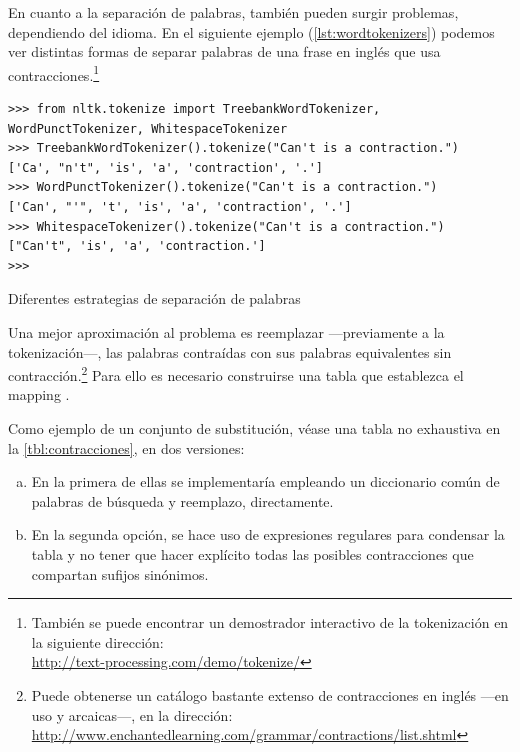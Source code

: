 En cuanto a la separación de palabras, también pueden surgir problemas, dependiendo del idioma. En el siguiente ejemplo (\autoref{lst:wordtokenizers}) podemos ver distintas formas de separar palabras de una frase en inglés que usa contracciones.\footnote{También se puede encontrar un demostrador interactivo de la tokenización en la siguiente dirección:\\
\url{http://text-processing.com/demo/tokenize/}}

\begin{listing}[H]
\begin{verbatim}
>>> from nltk.tokenize import TreebankWordTokenizer, WordPunctTokenizer, WhitespaceTokenizer
>>> TreebankWordTokenizer().tokenize("Can't is a contraction.")
['Ca', "n't", 'is', 'a', 'contraction', '.']
>>> WordPunctTokenizer().tokenize("Can't is a contraction.")
['Can', "'", 't', 'is', 'a', 'contraction', '.']
>>> WhitespaceTokenizer().tokenize("Can't is a contraction.")
["Can't", 'is', 'a', 'contraction.']
>>> 
\end{verbatim}
\caption{Diferentes estrategias de separación de palabras}
\label{lst:wordtokenizers}
\end{listing}

Una mejor aproximación al problema es reemplazar ---previamente a la tokenización---, las palabras contraídas con sus palabras equivalentes sin contracción.\footnote{Puede obtenerse un catálogo bastante extenso de contracciones en inglés ---en uso y arcaicas---, en la dirección:\\ \url{http://www.enchantedlearning.com/grammar/contractions/list.shtml}}
Para ello es necesario construirse una tabla que establezca el mapping \citep{Perkins2014}.

Como ejemplo de un conjunto de substitución, véase una tabla no exhaustiva en la \autoref{tbl:contracciones}, en dos versiones:
\nopagebreak
\begin{enumerate}[(a)]
\item En la primera de ellas se implementaría empleando un diccionario común de palabras de búsqueda y reemplazo, directamente.
\item En la segunda opción, se hace uso de expresiones regulares para condensar la tabla y no tener que hacer explícito todas las posibles contracciones que compartan sufijos sinónimos.
\end{enumerate}

